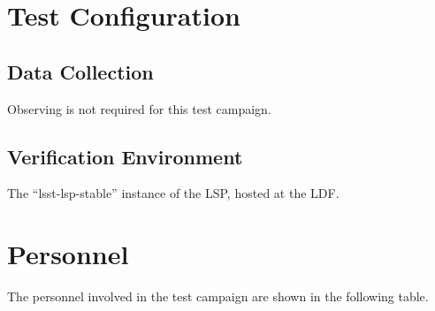 \documentclass[DM,lsstdraft,STR,toc]{lsstdoc}
\begin{document}
\section{Test Configuration}
\label{sect:configuration}

\subsection{Data Collection}

  Observing is not required for this test campaign.

\subsection{Verification Environment}
\label{sect:hwconf}
  The ``lsst-lsp-stable'' instance of the LSP, hosted at the LDF.





\newpage
\section{Personnel}
\label{sect:personnel}

The personnel involved in the test campaign are shown in the following table.
\end{document}
